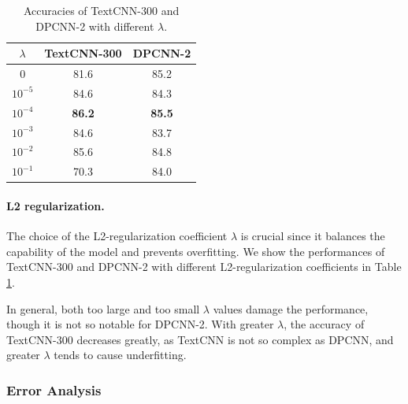 \documentclass[11pt,letterpaper]{article}
\begin{document}
    \begin{table}[htbp]
        \centering
        \begin{tabular}{ccc}
            \toprule
                {\bf $\lambda$} & {\bf TextCNN-300} & {\bf DPCNN-2} \\
            \midrule
                $0$             & 81.6              & 85.2       \\
                $10^{-5}$       & 84.6              & 84.3       \\
                $10^{-4}$       & {\bf 86.2}        & {\bf 85.5} \\
                $10^{-3}$       & 84.6              & 83.7       \\
                $10^{-2}$       & 85.6              & 84.8       \\
                $10^{-1}$       & 70.3              & 84.0       \\
            \bottomrule
        \end{tabular}
        \caption{\label{tab:l2} Accuracies of TextCNN-300 and DPCNN-2 with different $\lambda$.}
    \end{table}


    \paragraph{L2 regularization.} The choice of the L2-regularization 
    coefficient $\lambda$ is crucial since it balances the capability of the 
    model and prevents overfitting. We show the performances of TextCNN-300 and 
    DPCNN-2 with different L2-regularization coefficients in Table \ref{tab:l2}.
   
    In general, both too large and too small $\lambda$ values damage the 
    performance, though it is not so notable for DPCNN-2. With greater 
    $\lambda$, the accuracy of TextCNN-300 decreases greatly, as TextCNN is not 
    so complex as DPCNN, and greater $\lambda$ tends to cause underfitting.

\subsubsection{Error Analysis}
\end{document}
